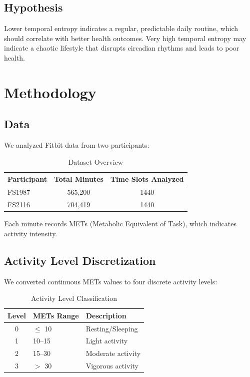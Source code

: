 \documentclass[12pt]{article}
\begin{document}
\subsection{Hypothesis}

Lower temporal entropy indicates a regular, predictable daily routine, which should correlate with better health outcomes. Very high temporal entropy may indicate a chaotic lifestyle that disrupts circadian rhythms and leads to poor health.

\section{Methodology}

\subsection{Data}

We analyzed Fitbit data from two participants:

\begin{table}[H]
\centering
\begin{tabular}{lcc}
\toprule
\textbf{Participant} & \textbf{Total Minutes} & \textbf{Time Slots Analyzed} \\
\midrule
FS1987 & 565,200 & 1440 \\
FS2116 & 704,419 & 1440 \\
\bottomrule
\end{tabular}
\caption{Dataset Overview}
\end{table}

Each minute records METs (Metabolic Equivalent of Task), which indicates activity intensity.

\subsection{Activity Level Discretization}

We converted continuous METs values to four discrete activity levels:

\begin{table}[H]
\centering
\begin{tabular}{cll}
\toprule
\textbf{Level} & \textbf{METs Range} & \textbf{Description} \\
\midrule
0 & $\leq$ 10 & Resting/Sleeping \\
1 & 10--15 & Light activity \\
2 & 15--30 & Moderate activity \\
3 & $>$ 30 & Vigorous activity \\
\bottomrule
\end{tabular}
\caption{Activity Level Classification}
\end{table}
\end{document}
